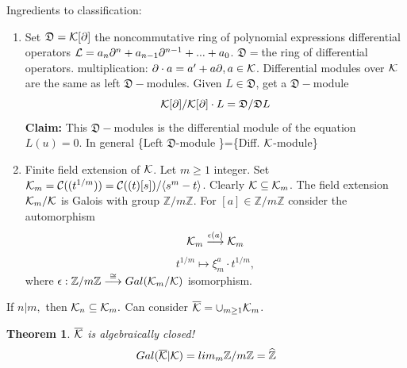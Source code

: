 \documentclass[11pt]{article}
\newtheorem{thm}{Theorem}[section]
\newcommand{\pd}{\partial}
\newcommand{\intg}{\mathbb Z}
\newcommand{\calc}{{\cal C}}
\newcommand{\calk}{{\cal K}}
\newcommand{\call}{{\cal L}}
\newcommand{\lrta}{\longrightarrow}
\newcommand{\lgl}{\langle}
\newcommand{\rgl}{\rangle}
\begin{document}
Ingredients to classification:
\begin{enumerate}
\item 
Set $\mathfrak{D}=\calk[\pd]$ the noncommutative ring of polynomial expressions differential operators
$\call=a_n\pd^n+a_{n-1}\pd^{n-1}+...+a_0$. $\mathfrak{D}=$the ring of differential operators. multiplication: $\pd\cdot a =a'+a\pd,a\in\calk$. Differential modules over $\calk$ are the same as left $\mathfrak{D}-$modules. Given $L\in\mathfrak{D}$, get a $\mathfrak{D}-$module
$$
\calk[\pd]/\calk[\pd]\cdot L=\mathfrak{D}/\mathfrak{D}L
$$
\textbf{Claim:}
This $\mathfrak{D}-$modules is the differential module of the equation $L(u)=0$. In general \{Left $\mathfrak{D}$-module \}=\{Diff. $\calk$-module\}
\item Finite field extension of $\calk$. Let $m\geq 1$ integer. Set $\calk_m=\calc((t^{1/m}))=\calc((t)[s])/\lgl s^m-t\rgl$. Clearly $\calk\subseteq \calk_m$. The field extension $\calk_m/\calk$ is Galois with group $\intg/m\intg$. For $[a]\in\intg/m\intg$ consider the automorphism
 $$
 \calk_m\overset{\epsilon(a)}{\lrta}\calk_m
 $$
 $$
 t^{1/m}\longmapsto \xi^a_m\cdot t^{1/m},
 $$
 where $\epsilon:\intg/m\intg\overset{\cong}{\lrta}Gal(\calk_m/\calk)$ isomorphism. 
\end{enumerate}
If $n|m,$ then $\calk_n\subseteq \calk_m.$ Can consider $\overline{\calk}=\cup_{m\geq 1}\calk_m$.
\begin{thm}
$\overline{\calk}$ is algebraically closed!
$$
Gal(\overline{\calk}|\calk)=lim_m \intg/m\intg=\widehat{\intg}
$$
\end{thm}
\end{document}
